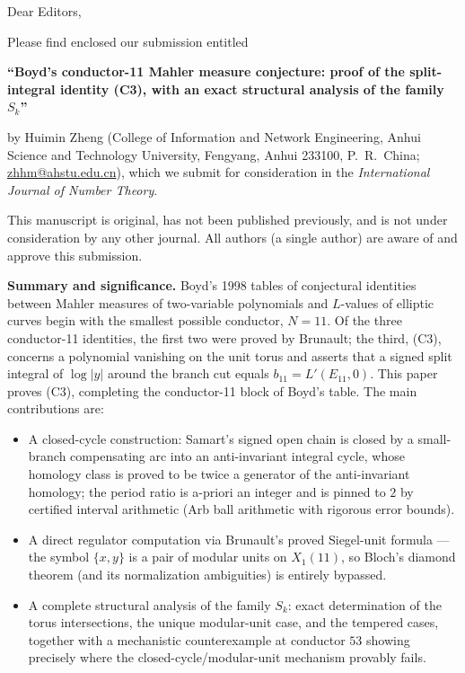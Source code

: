 \documentclass[11pt]{article}
\begin{document}
\thispagestyle{empty}

Dear Editors,

Please find enclosed our submission entitled

\begin{center}
\textbf{``Boyd's conductor-11 Mahler measure conjecture: proof of the
split-integral identity (C3), with an exact structural analysis of the
family $S_k$''}
\end{center}

by Huimin Zheng (College of Information and Network Engineering, Anhui
Science and Technology University, Fengyang, Anhui 233100, P.~R.~China;
\url{zhhm@ahstu.edu.cn}), which we submit for consideration in the
\emph{International Journal of Number Theory}.

This manuscript is original, has not been published previously, and is
not under consideration by any other journal. All authors (a single
author) are aware of and approve this submission.

\textbf{Summary and significance.} Boyd's 1998 tables of conjectural
identities between Mahler measures of two-variable polynomials and
$L$-values of elliptic curves begin with the smallest possible
conductor, $N=11$. Of the three conductor-11 identities, the first two
were proved by Brunault; the third, (C3), concerns a polynomial
vanishing on the unit torus and asserts that a signed split integral of
$\log|y|$ around the branch cut equals $b_{11}=L'(E_{11},0)$. This
paper proves (C3), completing the conductor-11 block of Boyd's table.
The main contributions are:
\begin{itemize}
\item A closed-cycle construction: Samart's signed open chain is closed
by a small-branch compensating arc into an anti-invariant integral
cycle, whose homology class is proved to be twice a generator of the
anti-invariant homology; the period ratio is a-priori an integer and
is pinned to $2$ by certified interval arithmetic (Arb ball arithmetic
with rigorous error bounds).
\item A direct regulator computation via Brunault's proved Siegel-unit
formula --- the symbol $\{x,y\}$ is a pair of modular units on
$X_1(11)$, so Bloch's diamond theorem (and its normalization
ambiguities) is entirely bypassed.
\item A complete structural analysis of the family $S_k$: exact
determination of the torus intersections, the unique modular-unit
case, and the tempered cases, together with a mechanistic
counterexample at conductor $53$ showing precisely where the
closed-cycle/modular-unit mechanism provably fails.
\end{itemize}
\end{document}
